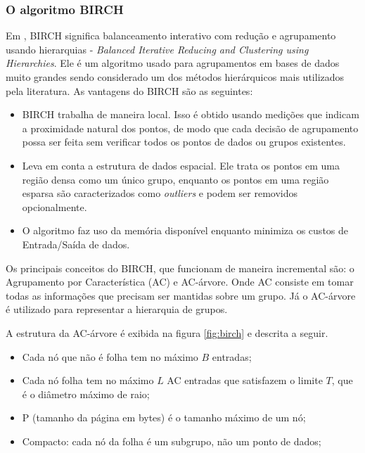 \subsubsection{O algoritmo BIRCH}
\label{sub:birch}

Em \cite{Zhang1996}, BIRCH significa balanceamento interativo com redução e agrupamento usando hierarquias - \emph{Balanced Iterative Reducing and Clustering using Hierarchies}. Ele é um algoritmo usado para agrupamentos em bases de dados muito grandes sendo considerado um dos métodos hierárquicos mais utilizados pela literatura. As vantagens do BIRCH são as seguintes:

\begin{itemize}
	\item BIRCH trabalha de maneira local. Isso é obtido usando medições que indicam a proximidade natural dos pontos, de modo que cada decisão de agrupamento possa ser feita sem verificar todos os pontos de dados ou grupos existentes.
	\item Leva em conta a estrutura de dados espacial. Ele trata os pontos em uma região densa como um único grupo, enquanto os pontos em uma região esparsa são caracterizados como \textit{outliers} e podem ser removidos opcionalmente.
	\item O algoritmo faz uso da memória disponível enquanto minimiza os custos de Entrada/Saída de dados.
\end{itemize}

Os principais conceitos do BIRCH, que funcionam de maneira incremental são: o Agrupamento por Característica (AC) e AC-árvore. Onde AC consiste em tomar todas as informações que precisam ser mantidas sobre um grupo. Já o AC-árvore é utilizado para representar a hierarquia de grupos.

A estrutura da AC-árvore é exibida na figura \ref{fig:birch} e descrita a seguir.

\begin{itemize}
    \item Cada nó que não é folha tem no máximo ${B}$ entradas;
    \item Cada nó folha tem no máximo ${L}$ AC entradas que satisfazem o limite ${T}$, que é o diâmetro máximo de raio;
    \item P (tamanho da página em bytes) é o tamanho máximo de um nó;
    \item Compacto: cada nó da folha é um subgrupo, não um ponto de dados;
\end{itemize}

